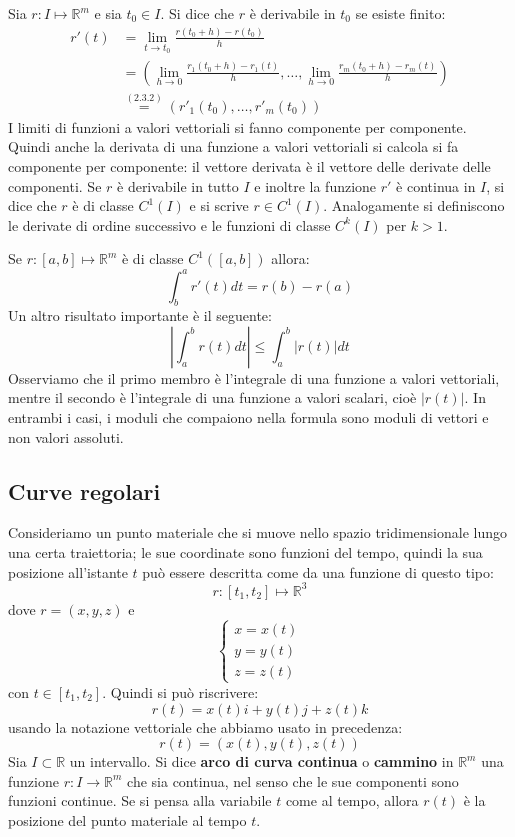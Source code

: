 \documentclass[a4paper]{article}
\numberwithin{equation}{subsection}
\begin{document}
\dfn{}
{
    Sia $r: I \mapsto \mathbb{R}^m$ e sia $t_0 \in I$. Si dice che $r$ è derivabile in $t_0$ se esiste finito:
    \begin{align*}
        r'(t) &= \lim_{t \rightarrow t_0} \frac{r(t_0 + h) - r(t_0)}{h}\\
        &= \left(\lim_{h \rightarrow 0} \frac{r_1(t_0 + h) - r_1(t)}{h}, \dots, \lim_{h \rightarrow 0} \frac{r_m(t_0 + h) - r_m(t)}{h}\right)\\
        &\stackrel{(2.3.2)}{=} (r'_1(t_0), \dots, r'_m(t_0))
    \end{align*}
}
\noindent
I limiti di funzioni a valori vettoriali si fanno componente per componente. Quindi
anche la derivata di una funzione a valori vettoriali si calcola si fa componente per componente: il vettore derivata è il vettore delle derivate delle componenti.
\dfn{}
{
    Se $r$ è derivabile in tutto $I$ e inoltre la funzione $r'$ è continua in $I$, si dice
    che $r$ è di classe $C^1(I)$ e si scrive $r \in C^1(I)$. Analogamente si definiscono le derivate di ordine successivo e le funzioni di classe $C^k(I)$ per $k>1$. 
}

{
    Se $r : [a,b] \mapsto \mathbb{R}^m$ è di classe $C^1([a,b])$ allora: 
    \[\int^{a}_b r'(t)dt = r(b) - r(a)\]
}
\noindent
Un altro risultato importante è il seguente:
\[\left|\int_a^b r(t)dt\right| \le \int_a^b |r(t)|dt\]
Osserviamo che il primo membro è l'integrale di una funzione a valori vettoriali, mentre il secondo è l'integrale di una funzione a valori scalari, cioè $|r(t)|$. 
In entrambi i casi, i moduli che compaiono nella formula sono moduli di vettori e non valori assoluti.

\subsection{Curve regolari}

Consideriamo un punto materiale che si muove nello spazio 
tridimensionale lungo una certa traiettoria; le sue coordinate sono funzioni
del tempo, quindi la sua posizione all'istante $t$ può essere descritta come 
da una funzione di questo tipo: 
\[r: [t_1, t_2] \mapsto \mathbb{R}^3\]
dove $r = (x,y,z)$ e 
\[
\begin{cases}
    x=x(t)\\
    y=y(t)\\
    z=z(t)
\end{cases}
\] 
con $t \in [t_1, t_2]$. Quindi si può riscrivere:
\[r(t) = x(t)i + y(t)j + z(t)k\]
usando la notazione vettoriale che abbiamo usato in precedenza:
\[r(t) = (x(t), y(t), z(t))\]
\dfn{
}
{
    Sia $I \subset \mathbb{R}$ un intervallo. Si dice \textbf{arco di curva continua} o \textbf{cammino} in
    $\mathbb{R}^m$ una funzione $r: I \rightarrow \mathbb{R}^m$ che sia continua, nel senso che le sue componenti sono funzioni continue.
}
\noindent
Se si pensa alla variabile $t$ come al tempo, allora $r(t)$ è la posizione del punto materiale al tempo $t$.
\end{document}
